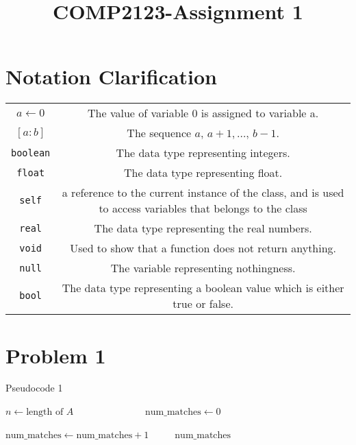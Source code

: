 \documentclass{article}
\title{COMP2123-Assignment 1}
\author{}
\begin{document}
	\maketitle
	\section*{Notation Clarification}
	\begin{center}
		\begin{tabular}{ c c }
			\(a \gets 0\) & The value of variable 0 is assigned to variable a. \\ 
			\([a:b]\) & The sequence \(a,\, a + 1, \ldots, \, b - 1\).\\
			\verb|boolean| & The data type representing integers.\\
			\verb|float| & The data type representing float.\\
			\verb|self| & a reference to the current instance of the class, and is used to access variables that belongs to the class\\
			\verb|real| & The data type representing the real numbers.\\
			\verb|void| & Used to show that a function does not return anything.\\
			\verb|null| & The variable representing nothingness.\\
			\verb|bool| & The data type representing a boolean value which is either true or false.\\
		\end{tabular}
	\end{center} 

	\newpage \section*{Problem 1}


	\begin{algorithm}[H]
		\caption{Pseudocode 1}
	\begin{algorithmic}[1]
		\State \(n \gets \text{length of } A \hspace{3cm}\)
		\State \(\text{num\_matches} \gets 0 \hspace{3cm}\)

					\State \(\text{num\_matches} \gets \text{num\_matches} + 1 \hspace{1cm}\) 
				\EndIf{}
			\EndFor{}
		\EndFor{}
		\State \Return \(\text{num\_matches}\)	
		\EndFunction{}
	\end{algorithmic}
	\end{algorithm}
\end{document}
